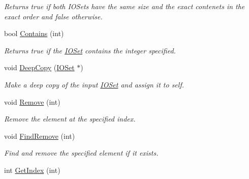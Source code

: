 \begin{DoxyCompactItemize}
\begin{DoxyCompactList}\small\item\em Returns true if both IOSets have the same size and the exact contenets in the exact order and false otherwise. \item\end{DoxyCompactList}\item 
\hypertarget{class_i_o_set_a928b470720d1ce878a73a06f39647de9}{
bool \hyperlink{class_i_o_set_a928b470720d1ce878a73a06f39647de9}{Contains} (int)}
\label{class_i_o_set_a928b470720d1ce878a73a06f39647de9}

\begin{DoxyCompactList}\small\item\em Returns true if the \hyperlink{class_i_o_set}{IOSet} contains the integer specified. \item\end{DoxyCompactList}\item 
\hypertarget{class_i_o_set_ae416909c86424400c72de7317346c733}{
void \hyperlink{class_i_o_set_ae416909c86424400c72de7317346c733}{DeepCopy} (\hyperlink{class_i_o_set}{IOSet} $\ast$)}
\label{class_i_o_set_ae416909c86424400c72de7317346c733}

\begin{DoxyCompactList}\small\item\em Make a deep copy of the input \hyperlink{class_i_o_set}{IOSet} and assign it to self. \item\end{DoxyCompactList}\item 
\hypertarget{class_i_o_set_a0021b9c44555444066dbb068f253a71c}{
void \hyperlink{class_i_o_set_a0021b9c44555444066dbb068f253a71c}{Remove} (int)}
\label{class_i_o_set_a0021b9c44555444066dbb068f253a71c}

\begin{DoxyCompactList}\small\item\em Remove the element at the specified index. \item\end{DoxyCompactList}\item 
\hypertarget{class_i_o_set_a7e135f27326a102ab45ec56b33f8c5c3}{
void \hyperlink{class_i_o_set_a7e135f27326a102ab45ec56b33f8c5c3}{FindRemove} (int)}
\label{class_i_o_set_a7e135f27326a102ab45ec56b33f8c5c3}

\begin{DoxyCompactList}\small\item\em Find and remove the specified element if it exists. \item\end{DoxyCompactList}\item 
\hypertarget{class_i_o_set_a8514a3475a49e427eece152dca282a8c}{
int \hyperlink{class_i_o_set_a8514a3475a49e427eece152dca282a8c}{GetIndex} (int)}
\label{class_i_o_set_a8514a3475a49e427eece152dca282a8c}


\end{DoxyCompactItemize}
